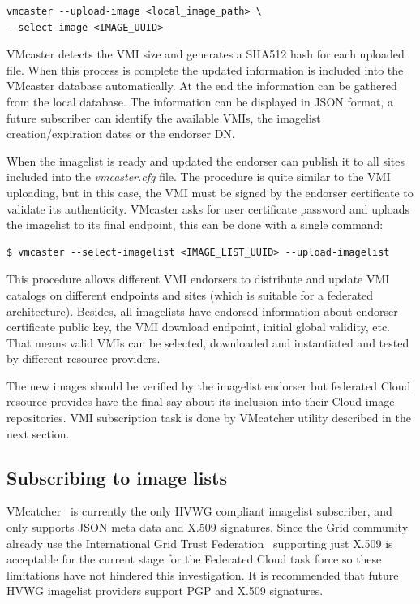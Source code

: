 \documentclass{cai}
\begin{document}
\begin{verbatim}
vmcaster --upload-image <local_image_path> \
--select-image <IMAGE_UUID>
\end{verbatim}

VMcaster detects the VMI size and generates a SHA512 hash for each uploaded file. When this process is complete the updated information is included into the VMcaster database automatically.
At the end the information can be gathered from the local database.
The information can be displayed in JSON format, a future subscriber can identify the available VMIs, the imagelist creation/expiration dates or the endorser DN.

When the imagelist is ready and updated the endorser can publish it to all sites included into the \textit{vmcaster.cfg} file. 
The procedure is quite similar to the VMI uploading, but in this case, the VMI must be signed by the endorser certificate to validate its authenticity.
VMcaster asks for user certificate password and uploads the imagelist to its final endpoint, this can be done with a single command:
\begin{verbatim}
$ vmcaster --select-imagelist <IMAGE_LIST_UUID> --upload-imagelist
\end{verbatim}
This procedure allows different VMI endorsers to distribute and update VMI catalogs on different endpoints and sites (which is suitable for a federated architecture).
Besides, all imagelists have endorsed information about endorser certificate public key, the VMI download endpoint, initial global validity, etc. 
That means valid VMIs can be selected, downloaded and instantiated and tested by different resource providers.

The new images should be verified by the imagelist endorser but federated Cloud resource provides have the final say about its inclusion into their Cloud image repositories. 
VMI subscription task is done by VMcatcher utility described in the next section.


\subsection{Subscribing to image lists}
VMcatcher~\cite{vmcatcher} is currently the only HVWG compliant imagelist subscriber, and only supports JSON meta data and X.509 signatures. Since the Grid community already use the International Grid Trust Federation~\cite{igtf} supporting just X.509 is acceptable for the current stage for the Federated Cloud task force so these limitations have not hindered this investigation. 
It is recommended that future HVWG imagelist providers support PGP and X.509 signatures.
\end{document}
